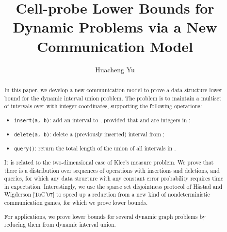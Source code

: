 \documentclass[11pt]{article}
\begin{document}
\newtheorem{theorem}{Theorem}
\newtheorem{innercustomthm}{Theorem}
\newenvironment{customthm}[1]
  {\renewcommand\theinnercustomthm{#1}\innercustomthm}
  {\endinnercustomthm}
\newtheorem{proposition}{Proposition}
\newtheorem{corollary}{Corollary}
\newtheorem{innercustomcor}{Corollary}
\newenvironment{customcor}[1]
  {\renewcommand\theinnercustomcor{#1}\innercustomcor}
  {\endinnercustomcor}
\newtheorem{lemma}{Lemma}
\newtheorem{claim}{Claim}
\newtheorem{definition}{Definition}
\newtheorem*{remark}{Remark}
\newcommand{\diu}{dynamic interval union}
\newcommand{\bps}{batch partial sum}
\newcommand{\es}{evenly-spreading}
\newcommand{\mi}{multi-index}
\newcommand{\mm}{model }
\newcommand{\E}{\ensuremath{\mathop{\mathbb{E}}}}
\newcommand{\rev}{\ensuremath{\mathrm{rev}}}

\title{Cell-probe Lower Bounds for Dynamic Problems via a New Communication Model}
\author{Huacheng Yu}
\date{}

\maketitle

\begin{abstract}
In this paper, we develop a new communication model to prove a data structure lower bound for the \diu{} problem. The problem is to maintain a multiset of intervals  over  with integer coordinates, supporting the following operations:
\begin{itemize}
	\item
		\verb+insert(a, b)+: add an interval  to , provided that  and  are integers in ;
	\item
		\verb+delete(a, b)+: delete a (previously inserted) interval  from ;
	\item
		\verb+query()+: return the total length of the union of all intervals in .
\end{itemize}

It is related to the two-dimensional case of Klee's measure problem. We prove that there is a distribution over sequences of operations with  insertions and deletions, and  queries, for which any data structure with any constant error probability requires  time in expectation. Interestingly, we use the sparse set disjointness protocol of H\aa{}stad and Wigderson [ToC'07] to speed up a reduction from a new kind of nondeterministic communication games, for which we prove lower bounds.

For applications, we prove lower bounds for several dynamic graph problems by reducing them from \diu{}.
\end{abstract}
\end{document}
